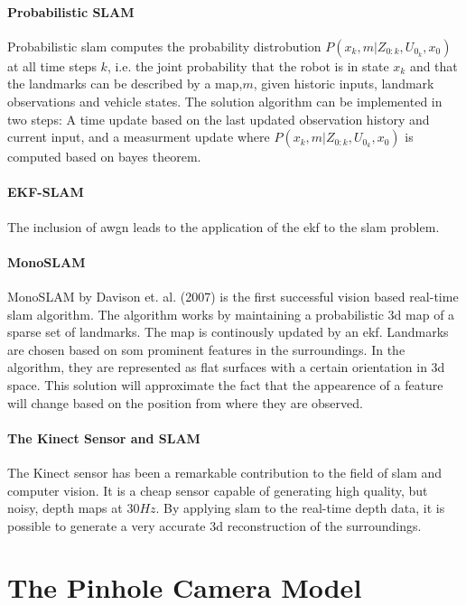 \paragraph{Probabilistic SLAM}
Probabilistic \gls{slam} computes the probability distrobution $P(x_k,m|Z_{0:k},U_{0_k},x_0)$ at all time steps $k$\cite{SLAMp1}, i.e. the joint probability that the robot is in state \boldmath$x_k$ and that the landmarks can be described by a map,\boldmath$m$, given historic inputs, landmark observations and vehicle states. The solution algorithm can be implemented in two steps: A time update based on the last updated observation history and current input, and a measurment update where $P(x_k,m|Z_{0:k},U_{0_k},x_0)$ is computed based on bayes theorem. 


\paragraph{EKF-SLAM}

The inclusion of \gls{awgn} leads to the application of the \gls{ekf} to the \gls{slam} problem\cite{SLAMp1}.
\paragraph{MonoSLAM}

MonoSLAM by Davison et. al. (2007) is the first successful vision based real-time \gls{slam} algorithm\cite{monoSLAM}. The algorithm works by maintaining a probabilistic 3d map of a sparse set of landmarks. The map is continously updated by an \gls{ekf}. Landmarks are chosen based on som prominent features in the surroundings. In the algorithm, they are represented as flat surfaces with a certain orientation in 3d space. This solution will approximate the fact that the appearence of a feature will change based on the position from where they are observed.

\paragraph{The Kinect Sensor and SLAM}

The Kinect sensor has been a remarkable contribution to the field of \gls{slam} and computer vision. It is a cheap sensor capable of generating high quality, but noisy, depth maps at $30 Hz$. By applying \gls{slam} to the real-time depth data, it is possible to generate a very accurate 3d reconstruction of the surroundings.


\section{The Pinhole Camera Model}

